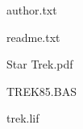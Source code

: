 \begin{DoxyItemize}
\begin{DoxyItemize}
\begin{DoxyItemize}
\begin{DoxyItemize}
\item author.\+txt
\item readme.\+txt
\item Star Trek.\+pdf
\item T\+R\+E\+K85.\+B\+AS
\item trek.\+lif 
\end{DoxyItemize}
\end{DoxyItemize}
\end{DoxyItemize}
\end{DoxyItemize}